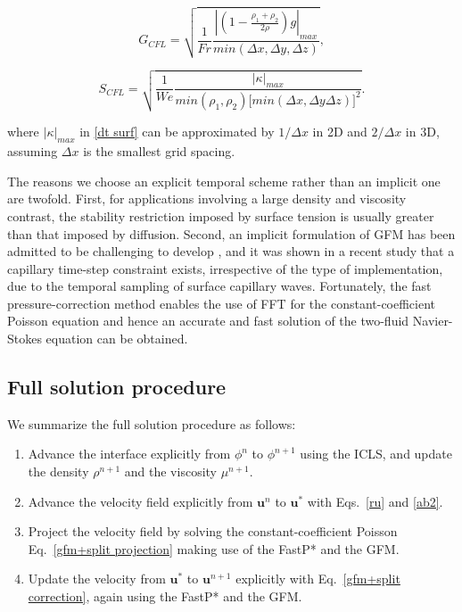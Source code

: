 \begin{equation}
  G_{CFL} = \sqrt{\frac{1}{Fr}\frac{|(1-\tfrac{\rho_1+\rho_2}{2\rho}) g|_{max}}{min (\Delta x,\Delta y,\Delta z)} },
  \label{dt grav}
\end{equation}

\begin{equation}
  S_{CFL} = \sqrt{\frac{1}{We}\frac{|\kappa|_{max}}{min(\rho_1,\rho_2) \big[min(\Delta x,\Delta y\Delta z)\big]^2}}.
  \label{dt surf}
\end{equation}

\noindent where $|\kappa|_{max}$ in \eqref{dt surf} can be approximated by $1/\Delta x$ in 2D and $2/\Delta x$ in 3D, assuming $\Delta x$ is the smallest grid spacing.

The reasons we choose an explicit temporal scheme rather than an implicit one are twofold. First, for applications involving a large density and viscosity contrast, the stability restriction imposed by surface tension is usually greater than that imposed by diffusion. Second, an implicit formulation of GFM has been admitted to be challenging to develop \cite{Desjardins_JCP_2008}, and it was shown in a recent study \cite{Denner&Wachem_JCP_2015} that a capillary time-step constraint exists, irrespective of the type of implementation, due to the temporal sampling of surface capillary waves. Fortunately, the fast pressure-correction method enables the use of FFT for the constant-coefficient Poisson equation and hence an accurate and fast solution of the two-fluid Navier-Stokes equation can be obtained.




\subsection{Full solution procedure}
\label{sec: procedure}

We summarize the full solution procedure as follows:

\begin{enumerate}

    \item Advance the interface explicitly from $\phi^{n}$ to $\phi^{n+1}$ using the ICLS, and update the density $\rho^{n+1}$ and the viscosity $\mu^{n+1}$.
    
    \item Advance the velocity field explicitly from ${\bm u}^{n}$ to ${\bm u}^{*}$ with Eqs.\ \eqref{ru} and \eqref{ab2}.
    
    \item Project the velocity field by solving the constant-coefficient Poisson Eq.\ \eqref{gfm+split projection} making use of the FastP* and the GFM.
    
    \item Update the velocity from ${\bm u}^{*}$ to ${\bm u}^{n+1}$ explicitly with Eq.\ \eqref{gfm+split correction}, again using the FastP* and the GFM.

\end{enumerate}


